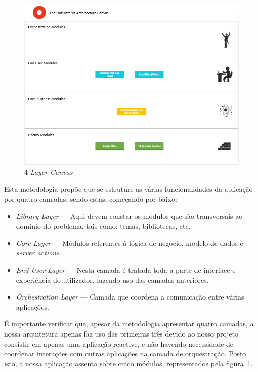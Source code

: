 \begin{figure}[H]
  \centering 
  \includegraphics[scale=0.7]{figures/4LayerCanvas.png}
  \caption{4 \textit{Layer Canvas}}\label{fig:4lc}
\end{figure}

Esta metodologia propõe que se estruture as várias funcionalidades da aplicação por quatro camadas, sendo estas, começando por baixo: 

\begin{itemize}
    \item \textit{Library Layer} --- Aqui devem constar os módulos que são transversais ao domínio do problema, tais como: temas, bibliotecas, etc. 
    \item \textit{Core Layer} --- Módulos referentes à lógica de negócio, modelo de dados e \textit{server actions}. 
    \item \textit{End User Layer} --- Nesta camada é tratada toda a parte de interface e experiência do utilizador, fazendo uso das camadas anteriores. 
    \item \textit{Orchestration Layer} --- Camada que coordena a comunicação entre várias aplicações. 
\end{itemize}

É importante verificar que, apesar da metodologia apresentar quatro camadas, 
a nossa arquitetura apenas faz uso das primeiras três devido ao nosso projeto consistir em apenas uma aplicação reactive, 
e não havendo necessidade de coordenar interações com outras aplicações na camada de orquestração. 
Posto isto, a nossa aplicação assenta sobre cinco módulos, representados pela figura~\ref{fig:4lc}.


